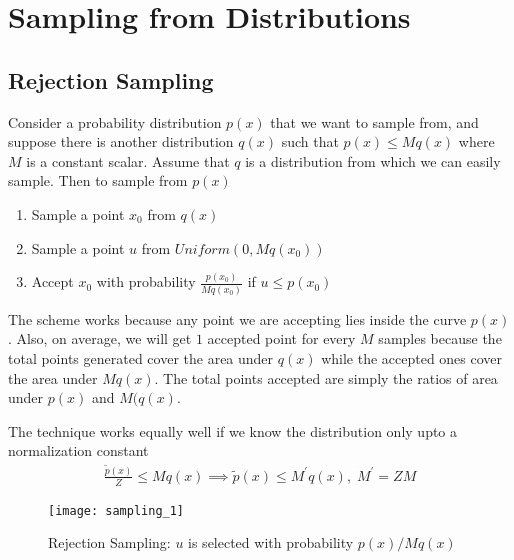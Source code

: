 \documentclass[../../statistical_learning_notes.tex]{subfiles}
\begin{document}
\section{Sampling from Distributions}
\subsection{Rejection Sampling}
Consider a probability distribution $p(x)$ that we want to sample from, and suppose there is another distribution $q(x)$ such that $p(x) \leq Mq(x)$ where $M$ is a constant scalar. Assume that $q$ is a distribution from which we can easily sample. Then to sample from $p(x)$
\begin{enumerate}
    \item Sample a point $x_{0}$ from $q(x)$
    \item Sample a point $u$ from $Uniform(0,Mq(x_{0}))$
    \item Accept $x_{0}$ with probability $\frac{p(x_{0})}{Mq(x_{0})}$ if $u \leq p(x_{0})$
\end{enumerate}

The scheme works because any point we are accepting lies inside the curve $p(x)$. Also, on average, we will get $1$ accepted point for every $M$ samples because the total points generated cover the area under $q(x)$ while the accepted ones cover the area under $Mq(x)$. The total points accepted are simply the ratios of area under $p(x)$ and $M(q(x)$.\newline

The technique works equally well if we know the distribution only upto a normalization constant
\begin{gather*}
    \frac{\tilde{p}(x)}{Z} \leq Mq(x) \implies \tilde{p}(x) \leq M^{\prime}q(x), \; M^{\prime} = ZM
\end{gather*}

\begin{figure}[h]
\texttt{[image: sampling\_1]}
\centering
\caption{Rejection Sampling: $u$ is selected with probability $p(x)/Mq(x)$}
\label{fig:sampling_1} %
\end{figure}
\end{document}
